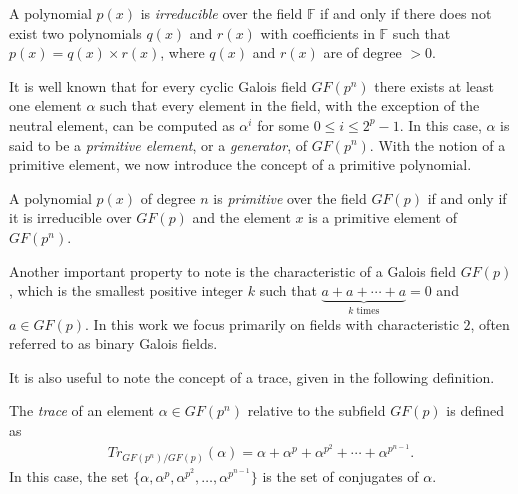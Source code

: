 \begin{definition}
A polynomial $p(x)$ is \emph{irreducible} over the field $\mathbb{F}$ if and only if there does not exist two polynomials $q(x)$ and $r(x)$ with coefficients in $\mathbb{F}$ such that $p(x) = q(x) \times r(x)$, where $q(x)$ and $r(x)$ are of degree $> 0$. 
\end{definition}


It is well known that for every cyclic Galois field $GF(p^n)$ there exists at least one element $\alpha$ such that every element in the field, with the exception of the neutral element, can be computed as $\alpha^i$ for some $0 \leq i \leq 2^p - 1$. In this case, $\alpha$ is said to be a \emph{primitive element}, or a \emph{generator}, of $GF(p^n)$. With the notion of a primitive element, we now introduce the concept of a primitive polynomial.

\begin{definition}
A polynomial $p(x)$ of degree $n$ is \emph{primitive} over the field $GF(p)$ if and only if it is irreducible over $GF(p)$ and the element $x$ is a primitive element of $GF(p^n)$. 
\end{definition}

Another important property to note is the characteristic of a Galois field $GF(p)$, which is the smallest positive integer $k$ such that $\underbrace{a + a + \dotsb + a}_{k \text{ times}} = 0$ and $a \in GF(p)$. In this work we focus primarily on fields with characteristic $2$, often referred to as binary Galois fields.

It is also useful to note the concept of a trace, given in the following definition.
\begin{definition}
The \emph{trace} of an element $\alpha \in GF(p^n)$ relative to the subfield $GF(p)$ is defined as
\begin{align*}
Tr_{GF(p^n) / GF(p)}(\alpha) = \alpha + \alpha^p + \alpha^{p^{2}} + \dotsb + \alpha^{p^{n-1}}.
\end{align*}
In this case, the set $\{\alpha, \alpha^{p}, \alpha^{p^{2}},\dots,\alpha^{p^{n-1}}\}$ is the set of conjugates of $\alpha$. 
\end{definition}


